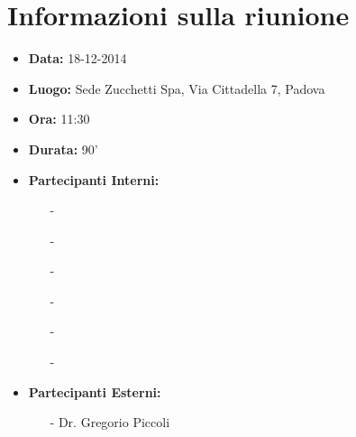 \section{Informazioni sulla riunione}
\begin{itemize}
	\item \textbf{Data:} 18-12-2014
	\item \textbf{Luogo:} Sede Zucchetti Spa, Via Cittadella 7, Padova
	\item \textbf{Ora:} 11:30
	\item \textbf{Durata:} 90'
	\item \textbf{Partecipanti Interni:}
	\begin{itemize}
		\item[-] \CaMa
		\item[-] \CoMa
		\item[-] \DeEn
		\item[-] \GoIs
		\item[-] \ReAn
		\item[-] \VeFe
	\end{itemize}
	\item \textbf{Partecipanti Esterni:}
	\begin{itemize}
    	\item[-] Dr. Gregorio Piccoli
    \end{itemize}
\end{itemize}